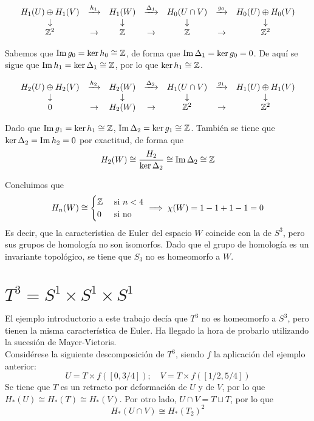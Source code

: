 \[\begin{array}{ccccccc}
H_1(U)\oplus H_1(V)	&\xrightarrow{h_1}	&H_1(W)&\xrightarrow{\Delta_1}&H_0(U\cap V)&\xrightarrow{g_0}&H_0(U) \oplus H_0(V)\\
\downarrow&		&\downarrow		&	&\downarrow & 	&\downarrow\\
\mathbb{Z}^2	& \rightarrow	&\mathbb{Z}	&\rightarrow	&\mathbb{Z} & \rightarrow & \mathbb{Z}^2	
\end{array}\]

Sabemos que $\operatorname{Im} g_0=\ker h_0 \cong \mathbb{Z}$, de forma que $\operatorname{Im} \Delta_1=\ker g_0=0$. De aquí se sigue que $\operatorname{Im} h_1=\ker \Delta_1\cong \mathbb{Z}$, por lo que $\ker h_1\cong \mathbb{Z}$. 

\[\begin{array}{ccccccc}
H_2(U)\oplus H_2(V)	&\xrightarrow{h_2}	&H_2(W)&\xrightarrow{\Delta_2}&H_1(U\cap V)&\xrightarrow{g_1}&H_1(U) \oplus H_1(V)\\
\downarrow&		&\downarrow		&	&\downarrow & 	&\downarrow\\
0& \rightarrow	&H_2(W)		&\rightarrow	&\mathbb{Z}^2 & \rightarrow & \mathbb{Z}^2	
\end{array}\]

Dado que $\operatorname{Im} g_1=\ker h_1\cong \mathbb{Z}$, $\operatorname{Im} \Delta_2=\ker g_1\cong \mathbb{Z}$. También se tiene que $\ker \Delta_2=\operatorname{Im} h_2=0$ por exactitud, de forma que $$H_2(W)\cong \frac{H_2}{\ker \Delta_2}\cong \operatorname{Im} \Delta_2\cong \mathbb{Z}$$

Concluimos que \[H_n(W)\cong\begin{cases}\mathbb{Z} & \mbox{ si }n < 4\\0 & \mbox{ si no}\end{cases} \implies\chi(W)=1-1+1-1=0\] Es decir, que la característica de Euler del espacio $W$ coincide con la de $S^3$, pero sus grupos de homología no son isomorfos. Dado que el grupo de homología es un invariante topológico, se tiene que $S_3$ no es homeomorfo a $W$.

\section{$T^3=S^1\times S^1 \times S^1$}
El ejemplo introductorio a este trabajo decía que $T^3$ no es homeomorfo a $S^3$, pero tienen la misma característica de Euler. Ha llegado la hora de probarlo utilizando la sucesión de Mayer-Vietoris.
\\

Considérese la siguiente descomposición de $T^3$, siendo $f$ la aplicación del ejemplo anterior: \[U=T\times f([0,3/4]); \quad V=T \times f([1/2,5/4])\] Se tiene que $T$ es un retracto por deformación de $U$ y de $V$, por lo que $H_*(U)\cong H_*(T) \cong H_*(V)$. Por otro lado, $U\cap V=T\sqcup T$, por lo que \[H_*(U\cap V)\cong H_*(T_2)^2\]

